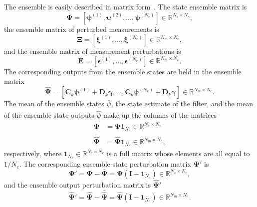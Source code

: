 The ensemble is easily described in matrix form~\cite{Evensen2003a}. The state ensemble matrix is
\begin{equation}
\label{eq:enkf-first}
\boldsymbol \Psi = \left[ \boldsymbol \psi^{(1)}, \boldsymbol \psi^{(2)}, \hdots, \boldsymbol \psi^{(N_e)} \right] \in \mathbb{R}^{N_s \times N_e},
\end{equation}
the ensemble matrix of perturbed measurements is
\begin{equation}
\boldsymbol \Xi = \left[ \boldsymbol \xi^{(1)}, \hdots, \boldsymbol \xi^{(N_e)}\right] \in \mathbb{R}^{N_m \times N_e},
\end{equation}
and the ensemble matrix of measurement perturbations is
\begin{equation}
\mathbf{E} = \left[ \boldsymbol \epsilon^{(1)} , \hdots, \boldsymbol \epsilon^{(N_e)}\right] \in \mathbb{R}^{N_m \times N_e}.
\end{equation}
The corresponding outputs from the ensemble states are held in the ensemble matrix
\begin{equation}
\hat{\boldsymbol \Psi } = \left[\mathbf{C}_k \boldsymbol{\psi}^{(1)} + \mathbf{D}_k \boldsymbol{\gamma}, \hdots, \mathbf{C}_k \boldsymbol{\psi}^{(N_e)} + \mathbf{D}_k \boldsymbol{\gamma} \right] \in \mathbb{R}^{N_m \times N_e}.
\end{equation}
The mean of the ensemble states $\bar{\psi}$, the state estimate of the filter, and the mean of the ensemble state outputs $\bar{\hat{\psi}}$ make up the columns of the matrices
\begin{align}
\bar{\boldsymbol \Psi } &=  \boldsymbol \Psi  \mathbf{1}_{N_e} \in \mathbb{R}^{N_s \times N_e}\\
\bar{\hat{\boldsymbol \Psi }} &=  \hat{\boldsymbol \Psi } \mathbf{1}_{N_e} \in \mathbb{R}^{N_m \times N_e},
\end{align}
respectively, where $\mathbf{1}_{N_e} \in \mathbb{R}^{N_e \times N_e}$ is a full matrix whose elements are all equal to $1/N_e$. The corresponding ensemble state perturbation matrix $\boldsymbol \Psi '$ is 
\begin{equation}
\boldsymbol \Psi ' = \boldsymbol \Psi  - \bar{\boldsymbol \Psi } =\boldsymbol \Psi (\mathbf{I} - \mathbf{1}_{N_e} )  \in \mathbb{R}^{N_s \times N_e},
\end{equation}
and the ensemble output perturbation matrix is $\hat{\boldsymbol \Psi }' $
\begin{equation}
\label{eq:enkf-last}
\hat{\boldsymbol \Psi }' = \hat{\boldsymbol \Psi } - \bar{\hat{\boldsymbol \Psi }} = \hat{\boldsymbol \Psi} (\mathbf{I} - \mathbf{1}_{N_e} )  \in \mathbb{R}^{N_m \times N_e}.
\end{equation}

